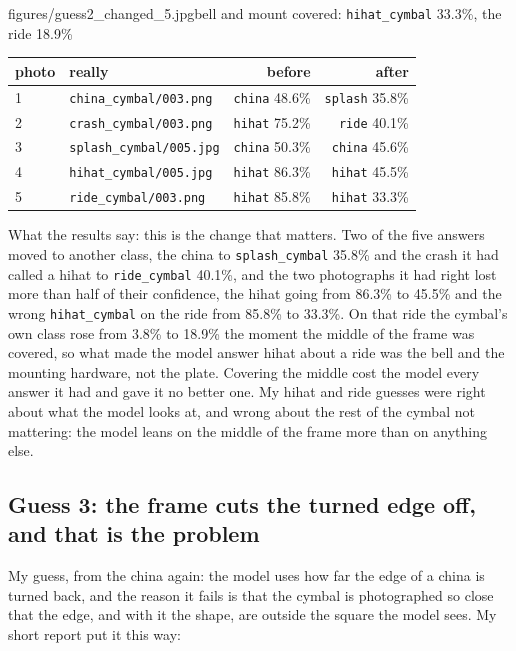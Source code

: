 \documentclass[11pt]{article}
\begin{document}
{figures/guess2_changed_5.jpg}{bell and mount covered:
\texttt{hihat\_cymbal} 33.3\%, the ride 18.9\%}

\begin{center}\footnotesize
\begin{tabular}{llrr}
\toprule
photo & really & before & after \\
\midrule
1 & \texttt{china\_cymbal/003.png}  & \texttt{china} 48.6\% & \texttt{splash} 35.8\% \\
2 & \texttt{crash\_cymbal/003.png}  & \texttt{hihat} 75.2\% & \texttt{ride} 40.1\% \\
3 & \texttt{splash\_cymbal/005.jpg} & \texttt{china} 50.3\% & \texttt{china} 45.6\% \\
4 & \texttt{hihat\_cymbal/005.jpg}  & \texttt{hihat} 86.3\% & \texttt{hihat} 45.5\% \\
5 & \texttt{ride\_cymbal/003.png}   & \texttt{hihat} 85.8\% & \texttt{hihat} 33.3\% \\
\bottomrule
\end{tabular}
\end{center}

What the results say: this is the change that matters. Two of the five answers
moved to another class, the china to \texttt{splash\_cymbal} 35.8\% and the
crash it had called a hihat to \texttt{ride\_cymbal} 40.1\%, and the two
photographs it had right lost more than half of their confidence, the hihat
going from 86.3\% to 45.5\% and the wrong \texttt{hihat\_cymbal} on the ride
from 85.8\% to 33.3\%. On that ride the cymbal's own class rose from 3.8\% to
18.9\% the moment the middle of the frame was covered, so what made the model
answer hihat about a ride was the bell and the mounting hardware, not the plate.
Covering the middle cost the model every answer it had and gave it no better
one. My hihat and ride guesses were right about what the model looks at, and
wrong about the rest of the cymbal not mattering: the model leans on the middle
of the frame more than on anything else.

\subsection*{Guess 3: the frame cuts the turned edge off, and that is the
problem}

My guess, from the china again: the model uses how far the edge of a china is
turned back, and the reason it fails is that the cymbal is photographed so close
that the edge, and with it the shape, are outside the square the model sees. My
short report put it this way:
\end{document}
